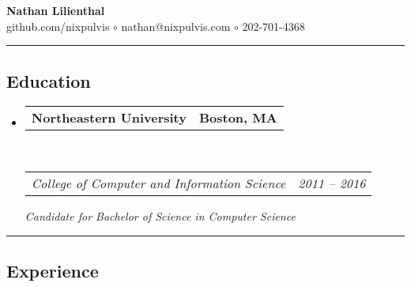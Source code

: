 \documentclass[10pt,letterpaper]{article}
\makeatletter
\newcommand{\headerrow}[2]
{\begin{tabular*}{\linewidth}{l@{\extracolsep{\fill}}r}
  #1 &
  #2 \\
\end{tabular*}}
\makeatother
\begin{document}
\begin{center}
{\huge \textbf{Nathan Lilienthal}}\\\vspace{.2ex}
{\large github.com/nixpulvis $\circ$ nathan@nixpulvis.com $\circ$ 202-701-4368}\vspace{-1ex}
\end{center}

\hrule
\vspace{-0.4em}
\subsection*{Education}

\begin{itemize}
  \parskip=0.1em

  \item 
  \headerrow
    {\textbf{Northeastern University}}
    {\textbf{Boston, MA}}
  \\
  \headerrow
    {\emph{College of Computer and Information Science}}
    {\emph{2011 -- 2016}}
    {\emph{Candidate for Bachelor of Science in Computer Science}}

\end{itemize}


\hrule
\vspace{-0.4em}
\subsection*{Experience}
\end{document}
